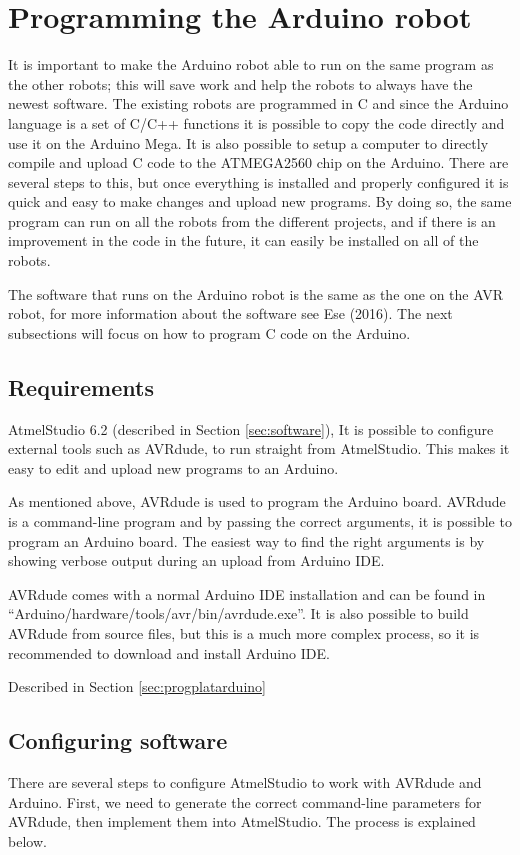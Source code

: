 \section{Programming the Arduino robot}
\label{sec:programardu}
It is important to make the Arduino robot able to run on the same program as the other robots; this will save work and help the robots to always have the newest software. The existing robots are programmed in C and since the Arduino language is a set of C/C++ functions it is possible to copy the code directly and use it on the Arduino Mega. It is also possible to setup a computer to directly compile and upload C code to the ATMEGA2560 chip on the Arduino. There are several steps to this, but once everything is installed and properly configured it is quick and easy to make changes and upload new programs. By doing so, the same program can run on all the robots from the different projects, and if there is an improvement in the code in the future, it can easily be installed on all of the robots.

The software that runs on the Arduino robot is the same as the one on the AVR robot, for more information about the software see Ese (2016). The next subsections will focus on how to program C code on the Arduino.
\subsection{Requirements}
AtmelStudio 6.2 (described in Section \ref{sec:software}), It is possible to configure external tools such as AVRdude, to run straight from AtmelStudio. This makes it easy to edit and upload new programs to an Arduino.

As mentioned above, AVRdude is used to program the Arduino board. AVRdude is a command-line program and by passing the correct arguments, it is possible to program an Arduino board. The easiest way to find the right arguments is by showing verbose output during an upload from Arduino IDE.

AVRdude comes with a normal Arduino IDE installation and can be found in ``Arduino/hardware/tools/avr/bin/avrdude.exe''. It is also possible to build AVRdude from source files, but this is a much more complex process, so it is recommended to download and install Arduino IDE.

Described in Section \ref{sec:progplatarduino}

\newpage
\subsection{Configuring software}
There are several steps to configure AtmelStudio to work with AVRdude and Arduino. First, we need to generate the correct command-line parameters for AVRdude, then implement them into AtmelStudio. The process is explained below.

